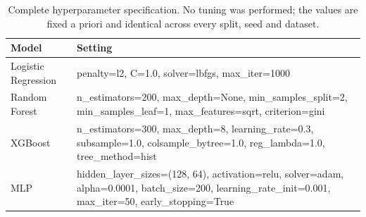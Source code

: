 \begin{table}[htbp]
\centering
\caption{Complete hyperparameter specification. No tuning was performed; the values are fixed a priori and identical across every split, seed and dataset.}
\label{tab:hyper}
\footnotesize
\begin{tabular}{lp{8.2cm}}
\hline
Model & Setting \\
\hline
Logistic Regression & penalty=l2, C=1.0, solver=lbfgs, max\_iter=1000 \\
Random Forest & n\_estimators=200, max\_depth=None, min\_samples\_split=2, min\_samples\_leaf=1, max\_features=sqrt, criterion=gini \\
XGBoost & n\_estimators=300, max\_depth=8, learning\_rate=0.3, subsample=1.0, colsample\_bytree=1.0, reg\_lambda=1.0, tree\_method=hist \\
MLP & hidden\_layer\_sizes=(128, 64), activation=relu, solver=adam, alpha=0.0001, batch\_size=200, learning\_rate\_init=0.001, max\_iter=50, early\_stopping=True \\
\hline
\end{tabular}
\end{table}
